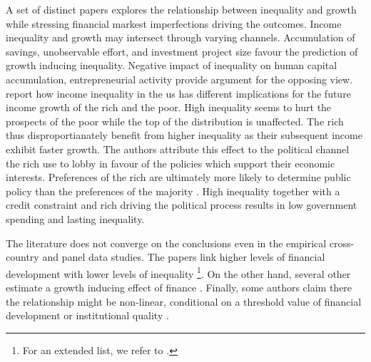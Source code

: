 \documentclass[a4paper,11pt]{article}
\begin{document}
A set of distinct papers explores the relationship between inequality and growth while stressing financial markest imperfections driving the outcomes. Income inequality and growth may intersect through varying channels. Accumulation of savings, unobservable effort, and investment project size favour the prediction of growth inducing inequality. Negative impact of inequality on human capital accumulation, entrepreneurial activity provide argument for the opposing view. 
\citet{van2018inequality} report how income inequality in the \ac{us} has different implications for the future income growth of the rich and the poor. High inequality seems to hurt the prospects of the poor while the top of the distribution is unaffected. The rich thus disproportianately benefit from higher inequality as their subsequent income exhibit faster growth. The authors attribute this effect to the political channel the rich use to lobby in favour of the policies which support their economic interests. Preferences of the rich are ultimately more likely to determine public policy than the preferences of the majority \citep{gilens_page_2014}. High inequality together with a credit constraint and rich driving the political process results in low government spending and lasting inequality.

The literature does not converge on the conclusions even in the empirical cross-country and panel data studies. The papers link higher levels of financial development with lower levels of inequality \citep{beck2007finance, hamori2012, gimet2011closer, kunieda2014finance}\footnote{For an extended list, we refer to \citet{de2017finance}.}. On the other hand, several other estimate a growth inducing effect of finance \citep{Jaumotte2013, jauch2016financial, de2017finance}. Finally, some authors claim there the relationship might be non-linear, conditional on a threshold value of financial development \citep{kim2011nonlinearity,tan2012nonlinear} or institutional quality \citep{LawSingh2014, delis2014}.
\end{document}
